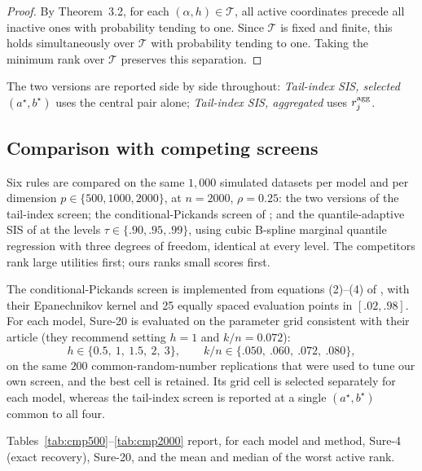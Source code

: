 \begin{proof}
By Theorem~3.2, for each $(\alpha,h)\in\mathcal T$, all active coordinates precede all inactive ones with probability tending to one. Since $\mathcal T$ is fixed and finite, this holds simultaneously over $\mathcal T$ with probability tending to one. Taking the minimum rank over $\mathcal T$ preserves this separation.
\end{proof}

The two versions are reported side by side throughout:
\emph{Tail-index SIS, selected $(a^\star,b^\star)$} uses the central
pair alone; \emph{Tail-index SIS, aggregated} uses $r_j^{\rm agg}$.

\subsection{Comparison with competing screens}\label{sec:comparison}

Six rules are compared on the same $1{,}000$ simulated datasets per
model and per dimension $p\in\{500,1000,2000\}$, at $n=2000$,
$\rho=0.25$: the two versions of the tail-index screen; the conditional-Pickands screen of \citet{yoshidaUmezu2026}; and the
quantile-adaptive SIS of \citet{heWangHong2013} at the levels
$\tau\in\{.90,.95,.99\}$, using cubic B-spline marginal quantile
regression with three degrees of freedom, identical at every level. The
competitors rank large utilities first; ours ranks small scores first.

The conditional-Pickands screen is implemented from equations (2)--(4)
of \citet{yoshidaUmezu2026}, with their Epanechnikov kernel and 25
equally spaced evaluation points in $[.02,.98]$. For each model, Sure-20 is evaluated on the parameter grid consistent with their article (they recommend setting $h=1$ and $k/n = 0.072$):
\[
 h\in\{0.5,\ 1,\ 1.5,\ 2,\ 3\},
 \qquad
 k/n\in\{.050,\ .060,\ .072,\ .080\},
\]
on the same $200$ common-random-number replications that were
used to tune our own screen, and the best cell is retained. Its grid cell is selected separately for each model, whereas the
tail-index screen is reported at a single $(a^\star,b^\star)$ common to
all four.

Tables~\ref{tab:cmp500}--\ref{tab:cmp2000} report, for each model and
method, Sure-4 (exact recovery), Sure-20, and the mean and median of the
worst active rank.






